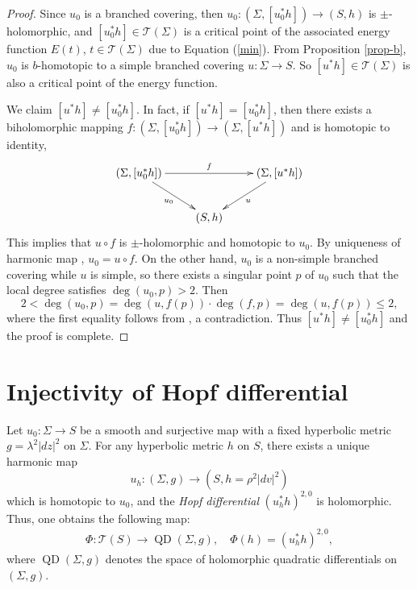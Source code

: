 \documentclass[11pt]{amsart}
\numberwithin{equation}{section}
\def\mc{\mathcal}
\theoremstyle{plain}
\theoremstyle{definition}
\theoremstyle{definition}
\begin{document}
\begin{proof}
Since $u_0$ is a branched covering, then $u_0:(\Sigma,[u_0^*h])\to(S,h)$ is $\pm$-holomorphic, and $[u_0^*h]\in\mc{T}(\Sigma)$ is a critical point of the associated energy function $E(t)$, $t\in\mc{T}(\Sigma)$ due to Equation (\ref{min}). 
From Proposition \ref{prop-b}, $u_0$ is $b$-homotopic to a simple branched covering $u:\Sigma\to S$. So $[u^*h]\in\mc{T}(\Sigma)$ is also a critical point of the energy function. 

We claim $[u^*h]\neq [u_0^*h]$. In fact, if $[u^*h]= [u_0^*h]$, then there exists a biholomorphic mapping $f:(\Sigma,[u_0^*h])\to (\Sigma,[u^*h])$ and is homotopic to identity,
 \[
\xymatrix{
(\Sigma,[u_0^*h])\ar[rr]^{f}\ar[rd]_{u_0}&&(\Sigma,[u^*h])\ar[ld]^{u}\\
&(S,h)
}
\]
This implies that $u\circ f$ is $\pm$-holomorphic and homotopic to $u_0$. By uniqueness of harmonic map \cite{Hart}, $u_0=u\circ f$. On the other hand, $u_0$ is a non-simple branched covering while $u$ is simple, so there exists a singular point $p$ of $u_0$ such that the local degree satisfies $\deg(u_0,p)> 2$. Then
\begin{equation*}
  2< \deg(u_0,p)=\deg(u,f(p))\cdot\deg(f,p)=\deg(u,f(p))\leq 2,
\end{equation*}
where the first equality follows from \cite[Lemma A.17]{BM}, a
contradiction. Thus $[u^*h]\neq [u_0^*h]$ and the proof is complete.
\end{proof}


\section{Injectivity of Hopf differential}\label{sec2}
Let $u_0:\Sigma\to S$ be a smooth and surjective map with a fixed  hyperbolic metric $g=\lambda^2|dz|^2$ on $\Sigma$. For any hyperbolic metric $h$ on $S$, there exists a unique harmonic map 
$$u_h:(\Sigma,g)\to (S,h=\rho^2|dv|^2)$$
which is homotopic to $u_0$, and  the {\it Hopf differential} $(u_h^*h)^{2,0}$ is holomorphic. Thus, one obtains the following map:  
\begin{align}
\Phi:	\mc{T}(S)\to \operatorname{QD}(\Sigma,g),\quad \Phi(h)=(u_h^*h)^{2,0},
\end{align}
where $\operatorname{QD}(\Sigma,g)$ denotes the space of holomorphic quadratic differentials on $(\Sigma,g)$. 
\end{document}
